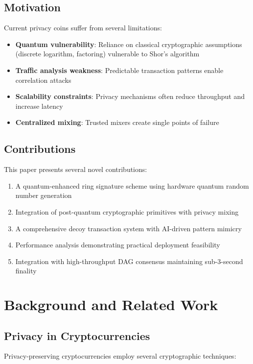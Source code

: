 \documentclass[12pt,a4paper]{article}
\begin{document}
\subsection{Motivation}

Current privacy coins suffer from several limitations:
\begin{itemize}
\item \textbf{Quantum vulnerability}: Reliance on classical cryptographic assumptions (discrete logarithm, factoring) vulnerable to Shor's algorithm
\item \textbf{Traffic analysis weakness}: Predictable transaction patterns enable correlation attacks
\item \textbf{Scalability constraints}: Privacy mechanisms often reduce throughput and increase latency
\item \textbf{Centralized mixing}: Trusted mixers create single points of failure
\end{itemize}

\subsection{Contributions}

This paper presents several novel contributions:
\begin{enumerate}
\item A quantum-enhanced ring signature scheme using hardware quantum random number generation
\item Integration of post-quantum cryptographic primitives with privacy mixing
\item A comprehensive decoy transaction system with AI-driven pattern mimicry
\item Performance analysis demonstrating practical deployment feasibility
\item Integration with high-throughput DAG consensus maintaining sub-3-second finality
\end{enumerate}

\section{Background and Related Work}

\subsection{Privacy in Cryptocurrencies}

Privacy-preserving cryptocurrencies employ several cryptographic techniques:
\end{document}
